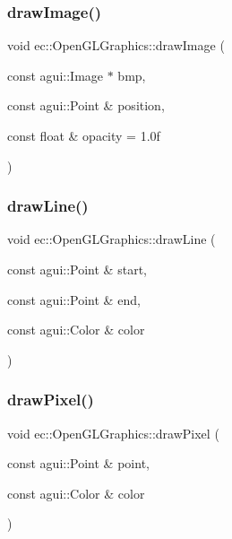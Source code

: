 \subsubsection{\texorpdfstring{draw\+Image()}{drawImage()}\hspace{0.1cm}{\footnotesize\ttfamily [2/2]}}
{\footnotesize\ttfamily void ec\+::\+Open\+G\+L\+Graphics\+::draw\+Image (\begin{DoxyParamCaption}\item[{const agui\+::\+Image $\ast$}]{bmp,  }\item[{const agui\+::\+Point \&}]{position,  }\item[{const float \&}]{opacity = {\ttfamily 1.0f} }\end{DoxyParamCaption})\hspace{0.3cm}{\ttfamily [override]}}

\mbox{\label{classec_1_1_open_g_l_graphics_a174cd34243e20b2639ece416b4df3a6b}} 
\subsubsection{\texorpdfstring{draw\+Line()}{drawLine()}}
{\footnotesize\ttfamily void ec\+::\+Open\+G\+L\+Graphics\+::draw\+Line (\begin{DoxyParamCaption}\item[{const agui\+::\+Point \&}]{start,  }\item[{const agui\+::\+Point \&}]{end,  }\item[{const agui\+::\+Color \&}]{color }\end{DoxyParamCaption})\hspace{0.3cm}{\ttfamily [override]}}

\mbox{\label{classec_1_1_open_g_l_graphics_a3f747db5664a109b28c66de6e092fbcf}} 
\subsubsection{\texorpdfstring{draw\+Pixel()}{drawPixel()}}
{\footnotesize\ttfamily void ec\+::\+Open\+G\+L\+Graphics\+::draw\+Pixel (\begin{DoxyParamCaption}\item[{const agui\+::\+Point \&}]{point,  }\item[{const agui\+::\+Color \&}]{color }\end{DoxyParamCaption})\hspace{0.3cm}{\ttfamily [override]}}

